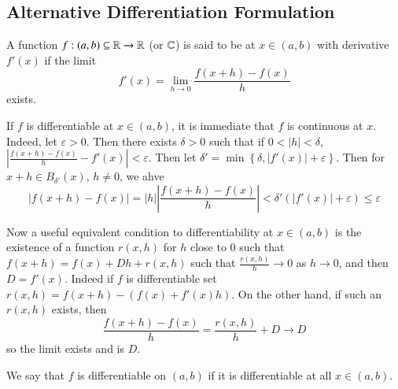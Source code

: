 \begin{subappendices}
    \section{Alternative Differentiation Formulation}

    \begin{defn}
        A function $f:(a,b)\subseteq \mathbb R\rightarrow \mathbb R$ (or $\mathbb C$) is said to be  at $x \in (a,b)$ with derivative $f'(x)$ if the limit \begin{equation*}
            f'(x) = \lim\limits_{h\rightarrow 0}\frac{f(x+h) - f(x)}{h}
        \end{equation*}
        exists.
    \end{defn}

    If $f$ is differentiable at $x \in (a,b)$, it is immediate that $f$ is continuous at $x$. Indeed, let $\varepsilon > 0$. Then there exists $\delta > 0$ such that if $0 < |h| < \delta$, $\left|\frac{f(x+h)-f(x)}{h} - f'(x)\right| < \varepsilon$. Then let $\delta' = \min\left\{\delta, |f'(x)| + \varepsilon\right\}$. Then for $x+h \in B_{\delta'}(x)$, $h \neq 0$, we ahve \begin{equation*}
        |f(x+h) - f(x)| = |h|\left|\frac{f(x+h)-f(x)}{h}\right| < \delta'(|f'(x)| + \varepsilon) \leq \varepsilon
    \end{equation*}

    Now a useful equivalent condition to differentiability at $x \in (a,b)$ is the existence of a function $r(x,h)$ for $h$ close to $0$ such that $f(x+h) = f(x) + Dh + r(x,h)$ such that $\frac{r(x,h)}{h}\rightarrow 0$ as $h\rightarrow 0$, and then $D = f'(x)$. Indeed if $f$ is differentiable set $r(x,h) = f(x+h) - (f(x) + f'(x)h)$. On the other hand, if such an $r(x,h)$ exists, then $$\frac{f(x+h)-f(x)}{h} = \frac{r(x,h)}{h}+D\rightarrow D$$ so the limit exists and is $D$.

    \begin{defn}
        We say that $f$ is differentiable on $(a,b)$ if it is differentiable at all $x \in (a,b)$.
    \end{defn}


\end{subappendices}
